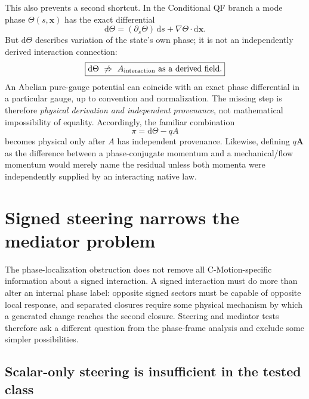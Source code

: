\documentclass[11pt]{article}
\theoremstyle{definition}
\newcommand{\dd}{\mathrm{d}}
\begin{document}
This also prevents a second shortcut.  In the Conditional QF branch a mode phase $\Theta(s,\mathbf x)$ has the exact differential
\begin{equation}
 \dd\Theta=(\partial_s\Theta)\,\dd s+\nabla\Theta\cdot\dd\mathbf x.
 \label{eq:qf_exact_phase_gradient}
\end{equation}
But $\dd\Theta$ describes variation of the state's own phase; it is not an independently derived interaction connection:
\begin{equation}
 \boxed{\dd\Theta\ \not\Rightarrow\ A_{\rm interaction}\ \text{as a derived field}.}
 \label{eq:phase_not_connection}
\end{equation}
An Abelian pure-gauge potential can coincide with an exact phase differential in a particular gauge, up to convention and normalization.  The missing step is therefore \emph{physical derivation and independent provenance}, not mathematical impossibility of equality.  Accordingly, the familiar combination
\begin{equation}
 \pi=\dd\Theta-qA
 \label{eq:conditional_phase_covector}
\end{equation}
becomes physical only after $A$ has independent provenance.  Likewise, defining $q\mathbf A$ as the difference between a phase-conjugate momentum and a mechanical/flow momentum would merely name the residual unless both momenta were independently supplied by an interacting native law.

\section{Signed steering narrows the mediator problem}
\label{sec:signed_mediator}

The phase-localization obstruction does not remove all C-Motion-specific information about a signed interaction.  A signed interaction must do more than alter an internal phase label: opposite signed sectors must be capable of opposite local response, and separated closures require some physical mechanism by which a generated change reaches the second closure.  Steering and mediator tests therefore ask a different question from the phase-frame analysis and exclude some simpler possibilities.

\subsection{Scalar-only steering is insufficient in the tested class}
\end{document}
